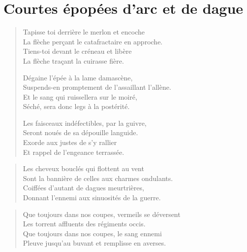 \section*{Courtes épopées d’arc et de dague}
\begin{verse}
Tapisse toi derrière le merlon et encoche\\
La flèche perçant le catafractaire en approche.\\
Tiens-toi devant le créneau et libère\\
La flèche traçant la cuirasse fière.

Dégaine l’épée à la lame damascène,\\
Suspends-en promptement de l’assaillant l’allène.\\
Et le sang qui ruissellera sur le moiré,\\
Séché, sera donc legs à la postérité.

Les faisceaux indéfectibles, par la guivre,\\
Seront noués de sa dépouille languide.\\
Exorde aux justes de s’y rallier\\
Et rappel de l’engeance terrassée.
\end{verse}

\begin{verse}
Les cheveux bouclés qui flottent au vent\\
Sont la bannière de celles aux charmes ondulants.\\
Coiffées d’autant de dagues meurtrières,\\
Donnant l’ennemi aux sinuosités de la guerre.
\end{verse}

\begin{verse}
Que toujours dans nos coupes, vermeils se déversent\\
Les torrent affluents des  régiments occis.\\
Que toujours dans nos coupes, le sang ennemi\\
Pleuve jusqu’au buvant et remplisse en averses.
\end{verse}



